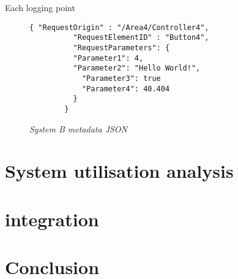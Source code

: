 Each logging point 



\begin{figure}[!htb]
	\centering
	\begin{lstlisting}[style=json] 
		{ "RequestOrigin" : "/Area4/Controller4",
		  "RequestElementID" : "Button4",
		  "RequestParameters": {
		  "Parameter1": 4,
		  "Parameter2": "Hello World!",
			"Parameter3": true
			"Parameter4": 40.404
		  }		
		}
	\end{lstlisting}
	\caption[System B metadata JSON]
	{\textit{System B metadata JSON}}\label{fig:Ch2_Metadata_Json_Example}
\end{figure}

\section{System utilisation analysis}\label{ch2:system_utilisation_analysis}

\section{integration}

\section{Conclusion}